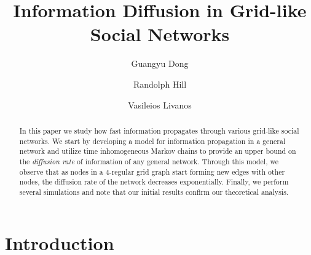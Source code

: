 \documentclass[format=acmsmall, review=false]{acmart}
\begin{document}
\title[Information Diffusion in Grid-like Social Networks]{Information Diffusion in Grid-like Social Networks}  
\author{Guangyu Dong}
\author{Randolph Hill}
\author{Vasileios Livanos}


\begin{abstract}
\par In this paper we study how fast information propagates through various grid-like social networks. We
start by developing a model for information propagation in a general network and utilize time inhomogeneous
Markov chains to provide an upper bound on the \textit{diffusion rate} of information of any
general network. Through this model, we observe that as nodes in a $4$-regular grid graph start forming
new edges with other nodes, the diffusion rate of the network decreases exponentially. Finally, we perform
several simulations and note that our initial results confirm our theoretical analysis.
\end{abstract}


\maketitle


\section{Introduction}
\end{document}
